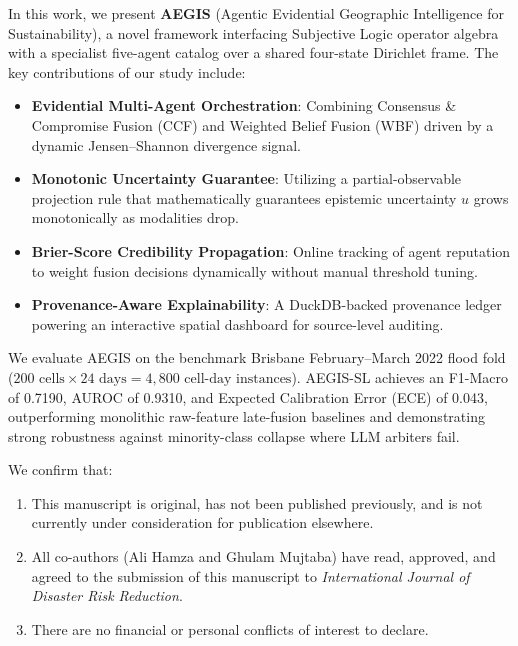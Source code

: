 \documentclass[11pt,a4paper]{article}
\begin{document}
\vspace{0.6em}

\noindent In this work, we present \textbf{AEGIS} (Agentic Evidential Geographic Intelligence for Sustainability), a novel framework interfacing Subjective Logic operator algebra with a specialist five-agent catalog over a shared four-state Dirichlet frame. The key contributions of our study include:
\begin{itemize}
    \item \textbf{Evidential Multi-Agent Orchestration}: Combining Consensus \& Compromise Fusion (CCF) and Weighted Belief Fusion (WBF) driven by a dynamic Jensen--Shannon divergence signal.
    \item \textbf{Monotonic Uncertainty Guarantee}: Utilizing a partial-observable projection rule that mathematically guarantees epistemic uncertainty $u$ grows monotonically as modalities drop.
    \item \textbf{Brier-Score Credibility Propagation}: Online tracking of agent reputation to weight fusion decisions dynamically without manual threshold tuning.
    \item \textbf{Provenance-Aware Explainability}: A DuckDB-backed provenance ledger powering an interactive spatial dashboard for source-level auditing.
\end{itemize}

\vspace{0.6em}

\noindent We evaluate AEGIS on the benchmark Brisbane February--March 2022 flood fold ($200 \text{ cells} \times 24 \text{ days} = 4,800 \text{ cell-day instances}$). AEGIS-SL achieves an F1-Macro of 0.7190, AUROC of 0.9310, and Expected Calibration Error (ECE) of 0.043, outperforming monolithic raw-feature late-fusion baselines and demonstrating strong robustness against minority-class collapse where LLM arbiters fail.

\vspace{0.6em}

\noindent We confirm that:
\begin{enumerate}
    \item This manuscript is original, has not been published previously, and is not currently under consideration for publication elsewhere.
    \item All co-authors (Ali Hamza and Ghulam Mujtaba) have read, approved, and agreed to the submission of this manuscript to \textit{International Journal of Disaster Risk Reduction}.
    \item There are no financial or personal conflicts of interest to declare.
\end{enumerate}
\end{document}
